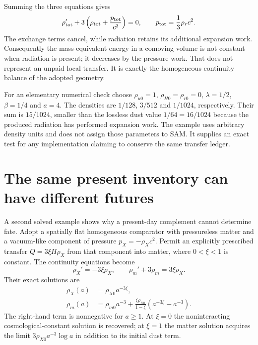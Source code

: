 Summing the three equations gives
\begin{equation}
 \rho_{\rm tot}'+3\left(\rho_{\rm tot}+\frac{p_{\rm tot}}{c^2}\right)=0,
 \qquad p_{\rm tot}=\frac13\rho_rc^2.
 \label{c12:totalcontinuity}
\end{equation}
The exchange terms cancel, while radiation retains its additional expansion work. Consequently the mass-equivalent energy in a comoving volume is not constant when radiation is present; it decreases by the pressure work. That does not represent an unpaid local transfer. It is exactly the homogeneous continuity balance of the adopted geometry.

For an elementary numerical check choose $\rho_{u0}=1$, $\rho_{H0}=\rho_{r0}=0$, $\lambda=1/2$, $\beta=1/4$ and $a=4$. The densities are $1/128$, $3/512$ and $1/1024$, respectively. Their sum is $15/1024$, smaller than the lossless dust value $1/64=16/1024$ because the produced radiation has performed expansion work. The example uses arbitrary density units and does not assign those parameters to SAM. It supplies an exact test for any implementation claiming to conserve the same transfer ledger.

\section{The same present inventory can have different futures}
A second solved example shows why a present-day complement cannot determine fate. Adopt a spatially flat homogeneous comparator with pressureless matter and a vacuum-like component of pressure $p_X=-\rho_Xc^2$. Permit an explicitly prescribed transfer $Q=3\xi H\rho_X$ from that component into matter, where $0<\xi<1$ is constant. The continuity equations become
\begin{equation}
 \rho_X'=-3\xi\rho_X,\qquad
 \rho_m'+3\rho_m=3\xi\rho_X.
 \label{c12:vacuumtransfer}
\end{equation}
Their exact solutions are
\begin{align}
 \rho_X(a)&=\rho_{X0}a^{-3\xi},\label{c12:vacuumsolution}\\
 \rho_m(a)&=\rho_{m0}a^{-3}
 +\frac{\xi\rho_{X0}}{1-\xi}(a^{-3\xi}-a^{-3}).
 \label{c12:mattersolution}
\end{align}
The right-hand term is nonnegative for $a\geq1$. At $\xi=0$ the noninteracting cosmological-constant solution is recovered; at $\xi=1$ the matter solution acquires the limit $3\rho_{X0}a^{-3}\log a$ in addition to its initial dust term.

